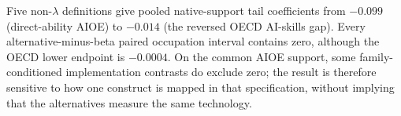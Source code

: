 Five non-$\lambda$ definitions give pooled native-support tail coefficients from $-0.099$ (direct-ability AIOE) to $-0.014$ (the reversed OECD AI-skills gap).  Every alternative-minus-beta paired occupation interval contains zero, although the OECD lower endpoint is $-0.0004$.  On the common AIOE support, some family-conditioned implementation contrasts do exclude zero; the result is therefore sensitive to how one construct is mapped in that specification, without implying that the alternatives measure the same technology.


